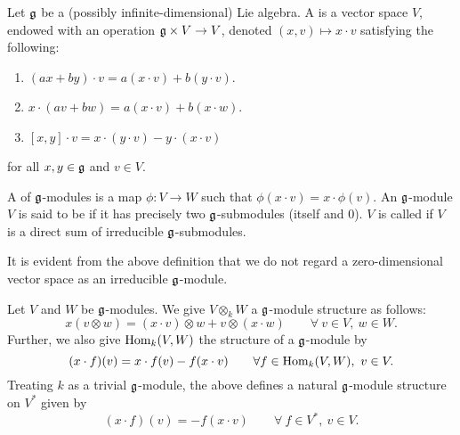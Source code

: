 \begin{definition}
    Let $\mathfrak{g}$ be a (possibly infinite-dimensional) Lie algebra. A  is a vector space $V$, endowed with an operation $\mathfrak{g}\times V\to V$, denoted $(x, v)\mapsto x\cdot v$ satisfying the following: 
    \begin{enumerate}[label=(M\arabic*)]
        \item $(ax + by)\cdot v = a(x\cdot v) + b(y\cdot v)$. 
        \item $x\cdot(av + bw) = a(x\cdot v) + b(x\cdot w)$.
        \item $[x, y]\cdot v = x\cdot(y\cdot v) - y\cdot(x\cdot v)$
    \end{enumerate}
    for all $x,y\in\mathfrak{g}$ and $v\in V$.

    A  of $\mathfrak{g}$-modules is a map $\phi: V\to W$ such that $\phi(x\cdot v) = x\cdot\phi(v)$. An $\mathfrak{g}$-module $V$ is said to be  if it has precisely two $\mathfrak{g}$-submodules (itself and $0$). $V$ is called  if $V$ is a direct sum of irreducible $\mathfrak{g}$-submodules.
\end{definition}

\begin{remark}
    It is evident from the above definition that we do not regard a zero-dimensional vector space as an irreducible $\mathfrak{g}$-module.
\end{remark}

Let $V$ and $W$ be $\mathfrak{g}$-modules. We give $V\otimes_k W$ a $\mathfrak{g}$-module structure as follows: 
\begin{equation*}
    x(v\otimes w) = (x\cdot v)\otimes w + v\otimes(x\cdot w)\qquad\forall~v\in V,~w\in W.
\end{equation*}
Further, we also give $\operatorname{Hom}_k(V, W)$ the structure of a $\mathfrak{g}$-module by 
\begin{equation*}
    (x\cdot f)(v) = x\cdot f(v) - f(x\cdot v)\qquad\forall f\in\operatorname{Hom}_k(V, W),~v\in V.
\end{equation*}
Treating $k$ as a trivial $\mathfrak{g}$-module, the above defines a natural $\mathfrak{g}$-module structure on $V^\ast$ given by 
\begin{equation*}
    (x\cdot f)(v) = -f(x\cdot v)\qquad\forall~f\in V^\ast,~v\in V.
\end{equation*}


